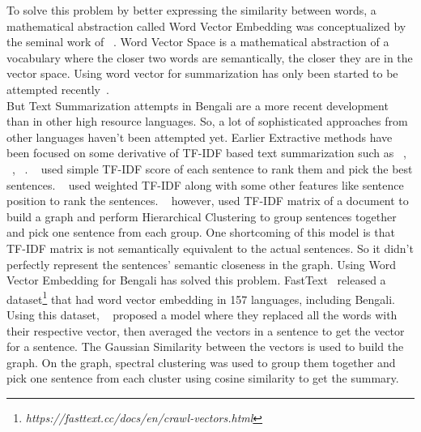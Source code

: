 To solve this problem by better expressing the similarity between words, a mathematical abstraction called Word Vector Embedding was conceptualized by the seminal work of \citeauthor{salton-1975-word-vector}~\cite{salton-1975-word-vector}. Word Vector Space is a mathematical abstraction of a vocabulary where the closer two words are semantically, the closer they are in the vector space. Using word vector for summarization has only been started to be attempted recently~\cite{Jain-2017-word-vector-embedding-summary}.\\

But Text Summarization attempts in Bengali are a more recent development than in other high resource languages. So, a lot of sophisticated approaches from other languages haven't been attempted yet. Earlier Extractive methods have been focused on some derivative of TF-IDF based text summarization such as \citeauthor{chowdhury-etal-2021-tfidf-clustering}~\cite{chowdhury-etal-2021-tfidf-clustering}, \citeauthor{das-2022-tfidf}~\cite{das-2022-tfidf}, \citeauthor{sarkar-2012-tfidf}~\cite{sarkar-2012-tfidf}. \citeauthor{sarkar-2012-tfidf}~\cite{sarkar-2012-tfidf} used simple TF-IDF score of each sentence to rank them and pick the best sentences. \citeauthor{das-2022-tfidf}~\cite{das-2022-tfidf} used weighted TF-IDF along with some other features like sentence position to rank the sentences. \citeauthor{chowdhury-etal-2021-tfidf-clustering}~\cite{chowdhury-etal-2021-tfidf-clustering} however, used TF-IDF matrix of a document to build a graph and perform Hierarchical Clustering to group sentences together and pick one sentence from each group. One shortcoming of this model is that TF-IDF matrix is not semantically equivalent to the actual sentences. So it didn't perfectly represent the sentences' semantic closeness in the graph. Using Word Vector Embedding for Bengali has solved this problem. FastText~\cite{grave-etal-2018-fasttext} released a dataset\footnote{\textit{https://fasttext.cc/docs/en/crawl-vectors.html}} that had word vector embedding in 157 languages, including Bengali. Using this dataset, \citeauthor{roychowdhury-etal-2022-spectral-base}~\cite{roychowdhury-etal-2022-spectral-base} proposed a model where they replaced all the words with their respective vector, then averaged the vectors in a sentence to get the vector for a sentence. The Gaussian Similarity between the vectors is used to build the graph. On the graph, spectral clustering was used to group them together and pick one sentence from each cluster using cosine similarity to get the summary.\\

